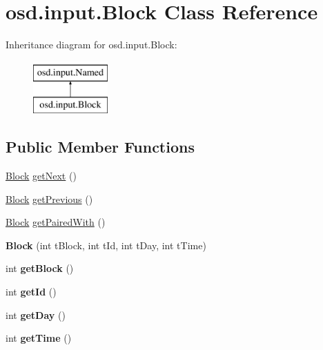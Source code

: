\hypertarget{interfaceosd_1_1input_1_1_block}{\section{osd.\-input.\-Block Class Reference}
\label{interfaceosd_1_1input_1_1_block}
}
Inheritance diagram for osd.\-input.\-Block\-:\begin{figure}[H]
\begin{center}
\leavevmode
\includegraphics[height=2.000000cm]{interfaceosd_1_1input_1_1_block}
\end{center}
\end{figure}
\subsection*{Public Member Functions}
\begin{DoxyCompactItemize}
\item 
\hyperlink{interfaceosd_1_1input_1_1_block}{Block} \hyperlink{interfaceosd_1_1input_1_1_block_a20c360683729107e2ffe8b2e207448c6}{get\-Next} ()
\item 
\hyperlink{interfaceosd_1_1input_1_1_block}{Block} \hyperlink{interfaceosd_1_1input_1_1_block_a82a4441c85609e3e137db9607bb88126}{get\-Previous} ()
\item 
\hyperlink{interfaceosd_1_1input_1_1_block}{Block} \hyperlink{interfaceosd_1_1input_1_1_block_ab5109873863db50f175e6a41693a1e0e}{get\-Paired\-With} ()
\item 
\hypertarget{interfaceosd_1_1input_1_1_block_a35ce0a9018221268bca81643b0f8f0e8}{{\bfseries Block} (int t\-Block, int t\-Id, int t\-Day, int t\-Time)}\label{interfaceosd_1_1input_1_1_block_a35ce0a9018221268bca81643b0f8f0e8}

\item 
\hypertarget{interfaceosd_1_1input_1_1_block_a974fd00b60c7eccaa2142903d6eb917f}{int {\bfseries get\-Block} ()}\label{interfaceosd_1_1input_1_1_block_a974fd00b60c7eccaa2142903d6eb917f}

\item 
\hypertarget{interfaceosd_1_1input_1_1_block_acd3ebe52ff61c3e0de4f3439474d85aa}{int {\bfseries get\-Id} ()}\label{interfaceosd_1_1input_1_1_block_acd3ebe52ff61c3e0de4f3439474d85aa}

\item 
\hypertarget{interfaceosd_1_1input_1_1_block_a662f746e53305cc8878c36291db446e8}{int {\bfseries get\-Day} ()}\label{interfaceosd_1_1input_1_1_block_a662f746e53305cc8878c36291db446e8}

\item 
\hypertarget{interfaceosd_1_1input_1_1_block_abc2d579a74f45f6b595098555b8ae232}{int {\bfseries get\-Time} ()}\label{interfaceosd_1_1input_1_1_block_abc2d579a74f45f6b595098555b8ae232}

\end{DoxyCompactItemize}


